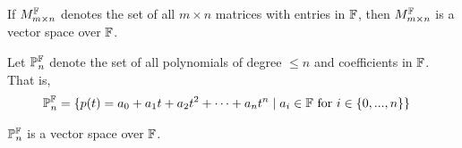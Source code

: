 \begin{thm}
    If $M^{\mathbb{F}}_{m \times n}$ denotes the set of all $m \times n$ matrices with entries in $\mathbb{F}$, then $M^{\mathbb{F}}_{m \times n}$ is a vector space over $\mathbb{F}$.
\end{thm}

\begin{thm}
    Let $\mathbb{P}^{\mathbb{F}}_n$ denote the set of all polynomials of degree $\leq n$ and coefficients in $\mathbb{F}$. That is,
    \begin{align*}
        \mathbb{P}^{\mathbb{F}}_n &= \{ p(t) = a_0 + a_1 t + a_2 t^2 + \cdots + a_n t^n \; | \; a_i \in \mathbb{F} \text{ for } i \in \{ 0, ..., n \} \}
    \end{align*}

    $\mathbb{P}^{\mathbb{F}}_n$ is a vector space over $\mathbb{F}$.
\end{thm}